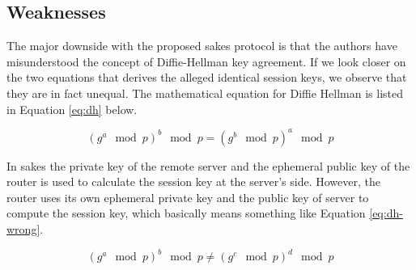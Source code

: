 \subsection{Weaknesses}

The major downside with the proposed \gls{sakes} protocol is that the authors have misunderstood the concept of Diffie-Hellman key agreement. If we look closer on the two equations that derives the alleged identical session keys, we observe that they are in fact unequal. The mathematical equation for Diffie Hellman is listed in Equation \ref{eq:dh} below.

\begin{equation}
\label{eq:dh}
(g^a \mod p)^b \mod p = (g^b \mod p)^a \mod p
\end{equation}

In \gls{sakes} the private key of the remote server and the ephemeral public key of the router is used to calculate the session key at the server's side. However, the router uses its own ephemeral private key and the public key of server to compute the session key, which basically means something like Equation \ref{eq:dh-wrong}.

\begin{equation}
\label{eq:dh-wrong}
(g^a \mod p)^b \mod p \neq (g^c \mod p)^d \mod p
\end{equation}









